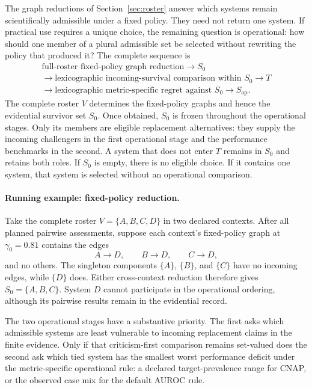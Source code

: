 \documentclass[11pt]{article}
\theoremstyle{remark}
\begin{document}
The graph reductions of Section~\ref{sec:roster} answer which systems remain scientifically
admissible under a fixed policy. They need not return one system. If practical
use requires a unique choice, the remaining question is operational: how
should one member of a plural admissible set be selected without rewriting the
policy that produced it? The complete sequence is
\[
\begin{gathered}
\text{full-roster fixed-policy graph reduction}
\longrightarrow S_0\\
\longrightarrow
\text{lexicographic incoming-survival comparison within }S_0
\longrightarrow T\\
\longrightarrow
\text{lexicographic metric-specific regret against }S_0
\longrightarrow S_{\mathrm{op}}.
\end{gathered}
\]
The complete roster $V$ determines the fixed-policy graphs and hence the
evidential survivor set $S_0$. Once obtained, $S_0$ is frozen throughout the
operational stages. Only its members are eligible replacement alternatives:
they supply the incoming challengers in the first operational stage and the
performance benchmarks in the second. A system that does not enter $T$
remains in $S_0$ and retains both roles. If $S_0$ is empty, there is no
eligible choice. If it contains one system, that system is selected without an
operational comparison.

\paragraph{Running example: fixed-policy reduction.}
Take the complete roster $V=\{A,B,C,D\}$ in two declared contexts. After all
planned pairwise assessments, suppose each context's fixed-policy graph at
$\gamma_0=0.81$ contains the edges
\[
A\longrightarrow D,
\qquad
B\longrightarrow D,
\qquad
C\longrightarrow D,
\]
and no others. The singleton components $\{A\}$, $\{B\}$, and $\{C\}$ have no
incoming edges, while $\{D\}$ does. Either cross-context reduction therefore
gives $S_0=\{A,B,C\}$. System $D$ cannot participate in the operational ordering,
although its pairwise results remain in the evidential record.

The two operational stages have a substantive priority. The first asks which
admissible systems are least vulnerable to incoming replacement claims in the
finite evidence. Only if that criticism-first comparison remains set-valued
does the second ask which tied system has the smallest worst performance
deficit under the metric-specific operational rule: a declared target-prevalence
range for CNAP, or the observed case mix for the default AUROC rule.
\end{document}
